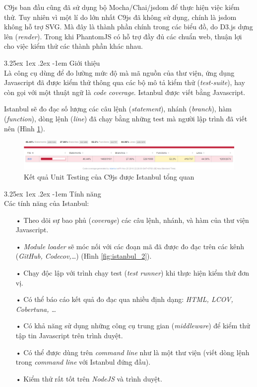\documentclass[12pt,a4paper,twoside]{article}
\makeatletter
\let\newcounter\@gobble\let\setcounter\@gobbletwo
\newcommand{\myparagraph}[1]{\paragraph{#1}\mbox{}\\} %
\newcounter{subsubsubsection}[subsubsection]
\renewcommand\paragraph{\@startsection{paragraph}{5}{\z@}%
  {3.25ex \@plus1ex \@minus.2ex}%
  {-1em}%
  {\normalfont\normalsize\bfseries}}
\makeatother
\begin{document}
C9js ban đầu cũng đã sử dụng bộ Mocha/Chai/jsdom để thực hiện việc kiểm thử. Tuy nhiên vì một lí do lớn nhất C9js đã không sử dụng, chính là jsdom không hỗ trợ SVG. Mà đây là thành phần chính trong các biểu đồ, do D3.js dựng lên (\textit{render}). Trong khi PhantomJS có hỗ trợ đầy đủ các chuẩn web, thuận lợi cho việc kiểm thử các thành phần khác nhau.

\label{sec:istanbul}
\myparagraph{Giới thiệu}
Là công cụ dùng để đo lường mức độ mà mã nguồn của thư viện, ứng dụng Javascript đã được kiểm thử thông qua các bộ mô tả kiểm thử (\textit{test-suite}), hay còn gọi với một thuật ngữ là \textit{code coverage}. Istanbul được viết bằng Javascript.

Istanbul sẽ đo đạc số lượng các câu lệnh (\textit{statement}), nhánh (\textit{branch}), hàm (\textit{function}), dòng lệnh (\textit{line}) đã chạy bằng những test mà người lập trình đã viết nên (Hình \ref{fig:istanbul_1}).

\begin{figure}[!h]
	\begin{center}
    \includegraphics[scale=.5]{image/istanbul_1}
    \caption{Kết quả Unit Testing của C9js được Istanbul tổng quan}
    \label{fig:istanbul_1}
	\end{center}
\end{figure}

\myparagraph{Tính năng}
Các tính năng của Istanbul:
\begin{itemize}
\item[•] Theo dõi sự bao phủ (\textit{coverage}) các câu lệnh, nhánh, và hàm của thư viện Javascript.
\item[•] \textit{Module loader} sẽ móc nối với các đoạn mã đã được đo đạc trên các kênh (\textit{GitHub, Codecov,…}) (Hình \ref{fig:istanbul_2}).
\item[•] Chạy độc lập với trình chạy test (\textit{test runner}) khi thực hiện kiểm thử đơn vị.
\item[•] Có thể báo cáo kết quả đo đạc qua nhiều định dạng: \textit{HTML, LCOV, Cobertuna, …}
\item[•] Có khả năng sử dụng những công cụ trung gian (\textit{middleware}) để kiểm thử tập tin Javascript trên trình duyệt.
\item[•] Có thể được dùng trên \textit{command line} như là một thư viện (viết dòng lệnh trong \textit{command line} với Istanbul đứng đầu).
\item[•] Kiểm thử rất tốt trên \textit{NodeJS} và trình duyệt.
\end{itemize}
\end{document}
